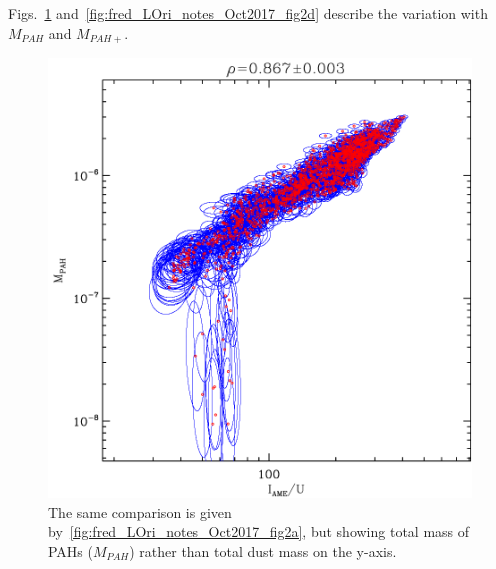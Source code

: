           Figs.~\ref{fig:fred_LOri_notes_Oct2017_fig2b} and~\ref{fig:fred_LOri_notes_Oct2017_fig2d} describe the variation with $M_{PAH}$ and $M_{PAH+}$.
              \begin{figure}
                \includegraphics[width=\textwidth/2]{../Plots/ch_lori/fred_LOri_notes_Oct2017_fig2b.pdf}
                \centering
                \caption{The same comparison is given by~\ref{fig:fred_LOri_notes_Oct2017_fig2a}, but showing total mass of PAHs ($M_{PAH}$) rather than total dust mass on the y-axis. }
                \label{fig:fred_LOri_notes_Oct2017_fig2b}
              \end{figure}
